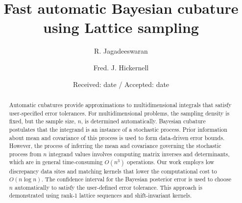 \documentclass[smallextended]{svjour3}       %
\begin{document}
\setlength\abovedisplayskip{1pt}
\setlength{\belowdisplayskip}{1pt}

\title{Fast automatic Bayesian cubature using Lattice sampling
}
%



\author{R. Jagadeeswaran         \and
        Fred. J. Hickernell %
}



\date{Received: date / Accepted: date}

\maketitle

\begin{abstract}
Automatic cubatures provide approximations to multidimensional integrals that satisfy user-specified error tolerances.  For multidimensional problems, the sampling density is fixed, but the
sample size, $n$, is determined automatically. Bayesian cubature postulates that the integrand is an instance of a stochastic process.
Prior information about mean and covariance of this process is used to form data-driven error bounds.  However, the process of inferring the mean and covariance governing the stochastic process from $n$ integrand values involves computing matrix inverses and determinants,
which are in general time-consuming $O(n^3)$ operations.
Our work employs low discrepancy data sites and matching kernels that lower the  computational cost to $O(n \log n)$.  The confidence interval for the Bayesian posterior error is used to choose $n$ automatically to satisfy the user-defined error tolerance.  This approach is demonstrated using rank-1 lattice sequences and shift-invariant kernels.


\end{abstract}
\end{document}
